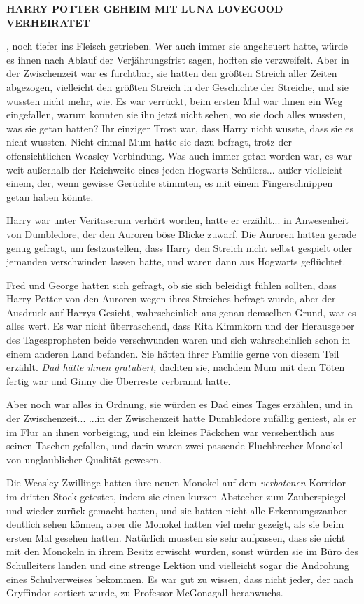 \textbf{HARRY POTTER GEHEIM MIT LUNA LOVEGOOD VERHEIRATET}

, noch tiefer ins Fleisch getrieben. Wer auch immer sie angeheuert hatte, würde
es ihnen nach Ablauf der Verjährungsfrist sagen, hofften sie verzweifelt. Aber
in der Zwischenzeit war es furchtbar, sie hatten den größten Streich aller
Zeiten abgezogen, vielleicht den größten Streich in der Geschichte der Streiche,
und sie wussten nicht mehr, wie. Es war verrückt, beim ersten Mal war ihnen ein
Weg eingefallen, warum konnten sie ihn jetzt nicht sehen, wo sie doch alles
wussten, was sie getan hatten? Ihr einziger Trost war, dass Harry nicht wusste,
dass sie es nicht wussten. Nicht einmal Mum hatte sie dazu befragt, trotz der
offensichtlichen Weasley-Verbindung. Was auch immer getan worden war, es war
weit außerhalb der Reichweite eines jeden Hogwarts-Schülers... außer vielleicht
einem, der, wenn gewisse Gerüchte stimmten, es mit einem Fingerschnippen getan
haben könnte.

Harry war unter Veritaserum verhört worden, hatte er erzählt... in Anwesenheit
von Dumbledore, der den Auroren böse Blicke zuwarf. Die Auroren hatten gerade
genug gefragt, um festzustellen, dass Harry den Streich nicht selbst gespielt
oder jemanden verschwinden lassen hatte, und waren dann aus Hogwarts geflüchtet.

Fred und George hatten sich gefragt, ob sie sich beleidigt fühlen sollten, dass
Harry Potter von den Auroren wegen ihres Streiches befragt wurde, aber der
Ausdruck auf Harrys Gesicht, wahrscheinlich aus genau demselben Grund, war es
alles wert. Es war nicht überraschend, dass Rita Kimmkorn und der Herausgeber
des Tagespropheten beide verschwunden waren und sich wahrscheinlich schon in
einem anderen Land befanden. Sie hätten ihrer Familie gerne von diesem Teil
erzählt. \emph{Dad hätte ihnen gratuliert,} dachten sie, nachdem Mum mit dem
Töten fertig war und Ginny die Überreste verbrannt hatte.

Aber noch war alles in Ordnung, sie würden es Dad eines Tages erzählen, und in
der Zwischenzeit... ...in der Zwischenzeit hatte Dumbledore zufällig geniest,
als er im Flur an ihnen vorbeiging, und ein kleines Päckchen war versehentlich
aus seinen Taschen gefallen, und darin waren zwei passende Fluchbrecher-Monokel
von unglaublicher Qualität gewesen.

Die Weasley-Zwillinge hatten ihre neuen Monokel auf dem \glqq
\emph{verbotenen}\grqq{} Korridor im dritten Stock getestet, indem sie einen
kurzen Abstecher zum Zauberspiegel und wieder zurück gemacht hatten, und sie
hatten nicht alle Erkennungszauber deutlich sehen können, aber die Monokel
hatten viel mehr gezeigt, als sie beim ersten Mal gesehen hatten. Natürlich
mussten sie sehr aufpassen, dass sie nicht mit den Monokeln in ihrem Besitz
erwischt wurden, sonst würden sie im Büro des Schulleiters landen und eine
strenge Lektion und vielleicht sogar die Androhung eines Schulverweises
bekommen. Es war gut zu wissen, dass nicht jeder, der nach Gryffindor sortiert
wurde, zu Professor McGonagall heranwuchs.

